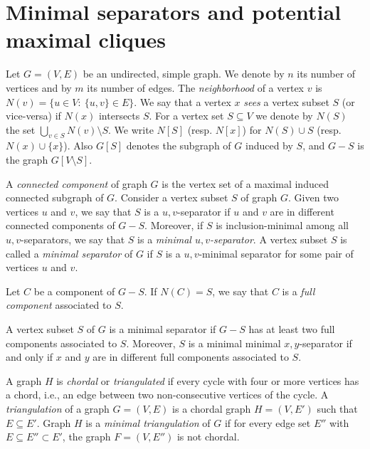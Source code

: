 \documentclass{llncs}
\newcommand{\pmc}{potential maximal clique}
\begin{document}
\section{Minimal separators and \pmc s}\label{se:prelim}


Let $G=(V,E)$ be an undirected, simple graph. We denote by $n$ its number of vertices and by $m$ its number of edges. The \emph{neighborhood} of a vertex $v$ is
$N(v)=\{u\in V:~\{u,v\}\in E\}$. We say that a vertex $x$ \emph{sees} a vertex subset $S$ (or vice-versa) if $N(x)$ intersects $S$.
For a vertex set $S\subseteq V$ we denote by $N(S)$ the set $\bigcup_{v \in S} N(v)\setminus S$. We write $N[S]$ (resp. $N[x]$) for $N(S) \cup S$ (resp. $N(x) \cup \{x\}$). 
Also $G[S]$ denotes the subgraph of $G$ induced by $S$, and $G - S$ is the graph $G[V \setminus S]$. 




A \emph{connected component} of graph $G$ is the vertex set of a maximal induced connected subgraph of $G$. Consider a vertex subset $S$ of graph $G$. Given two vertices $u$ and $v$, we say that $S$ is a $u,v$-separator if $u$ and $v$ are in different connected components of $G - S$. Moreover, if $S$ is inclusion-minimal among all $u,v$-separators, we say that $S$ is a \emph{minimal $u,v$-separator}. A vertex subset $S$ is called a \emph{minimal separator} of $G$ if $S$ is a $u,v$-minimal separator for some pair of vertices $u$ and $v$.

 Let $C$ be a component of $G - S$. If $N(C) = S$, we say that $C$ is a \emph{full component} associated to $S$. 

\begin{proposition}[folklore]\label{pr:full}
A vertex subset $S$ of $G$ is a minimal separator if $G - S$ has at least two full components associated to $S$. Moreover, $S$ is a minimal minimal $x,y$-separator if and only if $x$ and $y$ are in different full components associated to $S$. 
\end{proposition}



A graph $H$ is \emph{chordal} or \emph{triangulated} if every cycle with four or more vertices has a chord, i.e., an edge between two non-consecutive vertices of the cycle.
A {\em triangulation} of
a graph $G=(V,E)$ is a chordal graph $H = (V, E')$ such that $E
\subseteq E'$. Graph $H$ is a {\em minimal triangulation} of $G$ if
 for every
edge set $E''$ with $E \subseteq E'' \subset E'$, the
graph $F=(V, E'')$ is not chordal.
\end{document}
